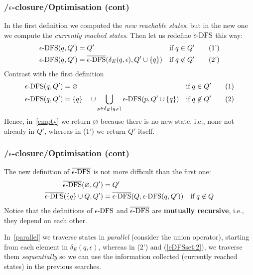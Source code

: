 %
\begin{frame}
\frametitle{\eNFA{}/\(\epsilon\)-closure/Optimisation (cont)}

In the first definition we computed the \emph{new reachable states},
but in the new one we compute the \emph{currently reached
  states}. Then let us redefine \(\epsilon\text{-DFS}\) this way:
\begin{align*}
  \epsilon\text{-DFS} (q, Q')
&= Q'
&& \text{if} \; q \in Q' \tag{1'}\\
  \epsilon\text{-DFS} (q, Q')
&= \overline{\epsilon\text{-DFS}} (\delta_E (q, \epsilon), Q' \cup \{q\})
&& \text{if} \; q \not\in Q' \tag{2'}
\end{align*}
Contrast with the first definition
\begin{align*}
   \epsilon\text{-DFS} (q, Q')
&= \varnothing
& \text{if} \; q \in Q' \tag{1} \label{empty}\\
  \epsilon\text{-DFS} (q, Q')
&= \{q\} \quad \cup \bigcup_{p \in \delta_E(q,\epsilon)}{\epsilon\text{-DFS} (p, Q'
    \cup \{q\})}
& \text{if} \; q \not\in Q' \tag{2} \label{parallel}
\end{align*}
Hence, in~\eqref{empty} we return \(\varnothing\) because there is no
new state, i.e., none not already in \(Q'\), whereas in (1') we return
\(Q'\) itself.

\end{frame}

%
\begin{frame}
\frametitle{\eNFA{}/\(\epsilon\)-closure/Optimisation (cont)}

The new definition of \(\overline{\epsilon\text{-DFS}}\) is not more difficult than the
first one:
\begin{align}
   \overline{\epsilon\text{-DFS}} (\varnothing, Q')
&= Q'\label{eDFSset:1}\\
   \overline{\epsilon\text{-DFS}} (\{q\} \cup Q, Q')
&= \overline{\epsilon\text{-DFS}} (Q, \epsilon\text{-DFS} (q, Q'))
& \text{if} \; q \not\in Q \label{eDFSset:2}
\end{align}
Notice that the definitions of \(\epsilon\text{-DFS}\) and \(\overline{\epsilon\text{-DFS}}\) are
\textbf{mutually recursive}, i.e., they depend on each other.

\bigskip

In~\eqref{parallel} we traverse states in \emph{parallel} (consider
the union operator), starting from each element in \(\delta_E (q,
\epsilon)\), whereas in (2') and (\ref{eDFSset:2}), we traverse them
\emph{sequentially} so we can use the information collected (currently
reached states) in the previous searches.

\end{frame}

